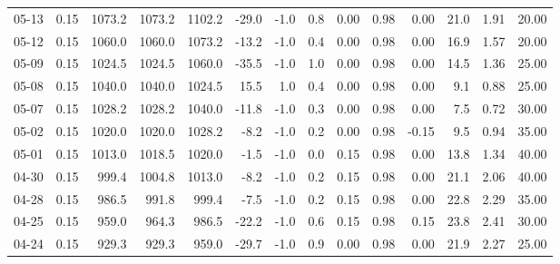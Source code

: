 \begin{threeparttable}
{\begin{tabular}{lrrrrrrrrrrrrr}
  05-13 &     0.15 & 1073.2 & 1073.2 & 1102.2 &      -29.0 &                     -1.0 &                 0.8 &       0.00 &      0.98 &           0.00 &             21.0 &            1.91 &                  20.00 \\
  05-12 &     0.15 & 1060.0 & 1060.0 & 1073.2 &      -13.2 &                     -1.0 &                 0.4 &       0.00 &      0.98 &           0.00 &             16.9 &            1.57 &                  20.00 \\
  05-09 &     0.15 & 1024.5 & 1024.5 & 1060.0 &      -35.5 &                     -1.0 &                 1.0 &       0.00 &      0.98 &           0.00 &             14.5 &            1.36 &                  25.00 \\
  05-08 &     0.15 & 1040.0 & 1040.0 & 1024.5 &       15.5 &                      1.0 &                 0.4 &       0.00 &      0.98 &           0.00 &              9.1 &            0.88 &                  25.00 \\
  05-07 &     0.15 & 1028.2 & 1028.2 & 1040.0 &      -11.8 &                     -1.0 &                 0.3 &       0.00 &      0.98 &           0.00 &              7.5 &            0.72 &                  30.00 \\
  05-02 &     0.15 & 1020.0 & 1020.0 & 1028.2 &       -8.2 &                     -1.0 &                 0.2 &       0.00 &      0.98 &          -0.15 &              9.5 &            0.94 &                  35.00 \\
  05-01 &     0.15 & 1013.0 & 1018.5 & 1020.0 &       -1.5 &                     -1.0 &                 0.0 &       0.15 &      0.98 &           0.00 &             13.8 &            1.34 &                  40.00 \\
  04-30 &     0.15 &  999.4 & 1004.8 & 1013.0 &       -8.2 &                     -1.0 &                 0.2 &       0.15 &      0.98 &           0.00 &             21.1 &            2.06 &                  40.00 \\
  04-28 &     0.15 &  986.5 &  991.8 &  999.4 &       -7.5 &                     -1.0 &                 0.2 &       0.15 &      0.98 &           0.00 &             22.8 &            2.29 &                  35.00 \\
  04-25 &     0.15 &  959.0 &  964.3 &  986.5 &      -22.2 &                     -1.0 &                 0.6 &       0.15 &      0.98 &           0.15 &             23.8 &            2.41 &                  30.00 \\
  04-24 &     0.15 &  929.3 &  929.3 &  959.0 &      -29.7 &                     -1.0 &                 0.9 &       0.00 &      0.98 &           0.00 &             21.9 &            2.27 &                  25.00 \\

\end{tabular}}
\end{threeparttable}
